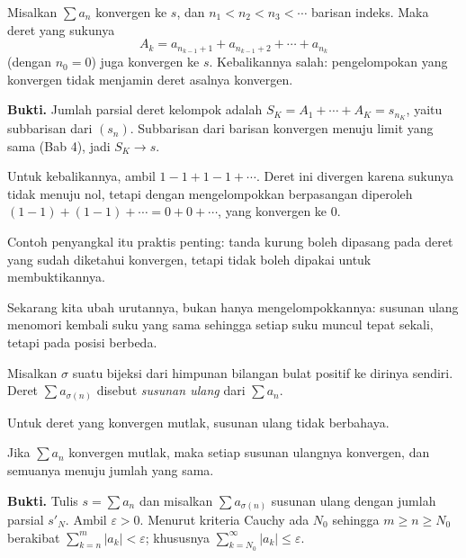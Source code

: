 \begin{proposisi}[Pengelompokan]
Misalkan $\sum a_n$ konvergen ke $s$, dan $n_1 < n_2 < n_3 < \cdots$ barisan indeks.
Maka deret yang sukunya
\[
  A_k = a_{n_{k-1}+1} + a_{n_{k-1}+2} + \cdots + a_{n_k}
\]
(dengan $n_0 = 0$) juga konvergen ke $s$. Kebalikannya salah: pengelompokan yang
konvergen tidak menjamin deret asalnya konvergen.
\end{proposisi}

\noindent\textbf{Bukti.} Jumlah parsial deret kelompok adalah $S_K = A_1 + \cdots + A_K = s_{n_K}$, yaitu
subbarisan dari $(s_n)$. Subbarisan dari barisan konvergen menuju limit yang sama
(Bab 4), jadi $S_K \to s$.

Untuk kebalikannya, ambil $1 - 1 + 1 - 1 + \cdots$. Deret ini divergen karena sukunya
tidak menuju nol, tetapi dengan mengelompokkan berpasangan diperoleh
$(1-1) + (1-1) + \cdots = 0 + 0 + \cdots$, yang konvergen ke $0$.

Contoh penyangkal itu praktis penting: tanda kurung boleh dipasang pada deret yang sudah
diketahui konvergen, tetapi tidak boleh dipakai untuk membuktikannya.

Sekarang kita ubah urutannya, bukan hanya mengelompokkannya: susunan ulang menomori
kembali suku yang sama sehingga setiap suku muncul tepat sekali, tetapi pada posisi
berbeda.

\begin{definisi}
Misalkan $\sigma$ suatu bijeksi dari himpunan bilangan bulat positif ke dirinya
sendiri. Deret $\sum a_{\sigma(n)}$ disebut \emph{susunan ulang} dari $\sum a_n$.
\end{definisi}


Untuk deret yang konvergen mutlak, susunan ulang tidak berbahaya.

\begin{teorema}
Jika $\sum a_n$ konvergen mutlak, maka setiap susunan ulangnya konvergen, dan
semuanya menuju jumlah yang sama.
\end{teorema}

\noindent\textbf{Bukti.} Tulis $s = \sum a_n$ dan misalkan $\sum a_{\sigma(n)}$ susunan ulang dengan jumlah
parsial $s'_N$. Ambil $\varepsilon > 0$. Menurut kriteria Cauchy ada $N_0$ sehingga
$m \ge n \ge N_0$ berakibat $\sum_{k=n}^{m} |a_k| < \varepsilon$; khususnya
$\sum_{k=N_0}^{\infty} |a_k| \le \varepsilon$.

